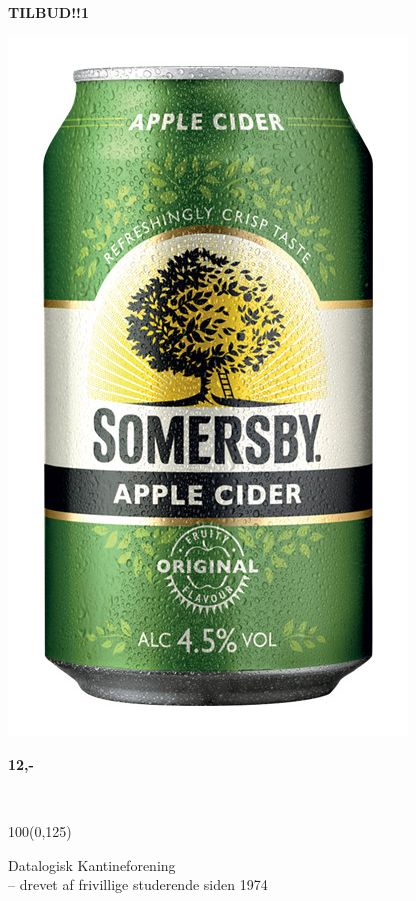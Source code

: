 \documentclass{article}
\begin{document}
~\vspace{1.3cm}

\Large

\begin{center}

\fontsize{30}{30}\selectfont

\textbf{TILBUD!!1}

\vspace{0.5cm}

\includegraphics[scale=0.3]{billeder/sommersby.jpg}

\vspace{0.3cm}

\textbf{12,-}

\end{center}

\normalsize

\vspace{\fill}

~

\begin{textblock}{100}(0,125)

\begin{flushright}
Datalogisk Kantineforening\\
-- drevet af frivillige studerende siden 1974
\end{flushright}

\end{textblock}
\end{document}

